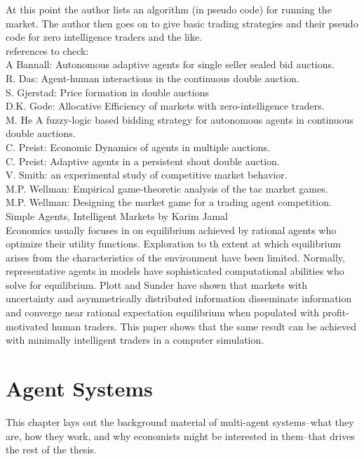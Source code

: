 \documentclass[12pt,twoside]{reedthesis}
\begin{document}
At this point the author lists an algorithm (in pseudo code) for running the market. The author then goes on to give basic trading strategies and their pseudo code for zero intelligence traders and the like.\\

references to check:\\
A Bannall: Autonomous adaptive agents for single seller sealed bid auctions.\\
R. Das: Agent-human interactions in the continuous double auction.\\
S. Gjerstad: Price formation in double auctions\\
D.K. Gode: Allocative Efficiency of markets with zero-intelligence traders.\\
M. He A fuzzy-logic based bidding strategy for autonomous agents in continuous double auctions.\\
C. Preist: Economic Dynamics of agents in multiple auctions.\\
C. Preist: Adaptive agents in a persistent shout double auction.\\
V. Smith: an experimental study of competitive market behavior.\\
M.P. Wellman: Empirical game-theoretic analysis of the tac market games.\\
M.P. Wellman: Designing the market game for a trading agent competition.\\

Simple Agents, Intelligent Markets by Karim Jamal\\
Economics usually focuses in on equilibrium achieved by rational agents who optimize their utility functions. Exploration to th extent at which equilibrium arises from the characteristics of the environment have been limited.  Normally, representative agents in models have sophisticated computational abilities who solve for equilibrium. Plott and Sunder have shown that markets with uncertainty and asymmetrically distributed information disseminate information and converge near rational expectation equilibrium when populated with profit-motivated human traders. This paper shows that the same result can be achieved with minimally intelligent traders in a computer simulation. 
\cite{Jamal2017}



	
\chapter{Agent Systems}
   	This chapter lays out the background material of multi-agent systems--what they are, how they work, and why economists might be interested in them--that drives the rest of the thesis. 
	
\end{document}
